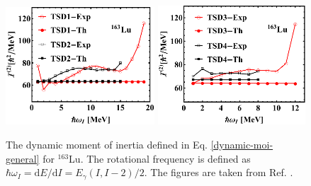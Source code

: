 \begin{figure}
    \centering
    \includegraphics[width=0.496\textwidth]{Chapters/Figures/Lu-exp-energies/fig16a_lu163.pdf}
    \includegraphics[width=0.49\textwidth]{Chapters/Figures/Lu-exp-energies/fig16b_lu163.pdf}
    \caption{The dynamic moment of inertia defined in Eq. \ref{dynamic-moi-general} for $^{163}$Lu. The rotational frequency is defined as $\hbar\omega_I=\text{d}E/\text{d}I=E_\gamma(I,I-2)/2$. The figures are taken from Ref. \cite{raduta2020approach}.}
    \label{dynamic-moi-Lu-163}
\end{figure}
